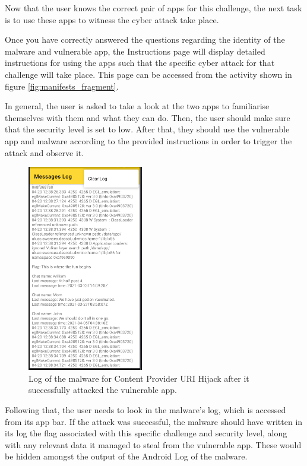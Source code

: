     Now that the user knows the correct pair of apps for this challenge, the next task is to use these apps to witness the cyber attack take place.
    
    Once you have correctly answered the questions regarding the identity of the malware and vulnerable app, the Instructions page will display detailed instructions for using the apps such that the specific cyber attack for that challenge will take place. This page can be accessed from the activity shown in figure \ref{fig:manifests_fragment}.
    
    In general, the user is asked to take a look at the two apps to familiarise themselves with them and what they can do. Then, the user should make sure that the security level is set to low. After that, they should use the vulnerable app and malware according to the provided instructions in order to trigger the attack and observe it. 
    
    \begin{figure}
        \centering
        \includegraphics[width=0.45\textwidth]{graphics/log.PNG}
        \caption{Log of the malware for Content Provider URI Hijack after it successfully attacked the vulnerable app.}
        \label{fig:malware_log}
    \end{figure}
    
    Following that, the user needs to look in the malware's log, which is accessed from its app bar. If the attack was successful, the malware should have written in its log the flag associated with this specific challenge and security level, along with any relevant data it managed to steal from the vulnerable app. These would be hidden amongst the output of the Android Log of the malware. 
    
